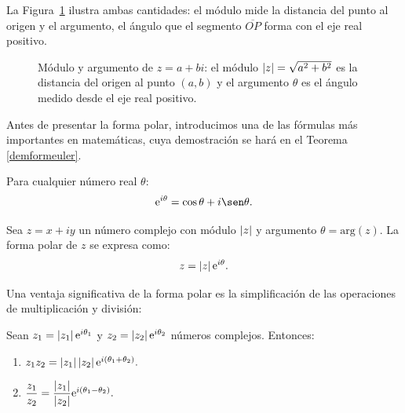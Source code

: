 La Figura~\ref{fig:modulo_argumento} ilustra ambas cantidades: el módulo mide la distancia del punto al origen y el argumento, el ángulo que el segmento $\overline{OP}$ forma con el eje real positivo.

\begin{figure}[!htbp]
\centering
{}
\caption{Módulo y argumento de $z=a+bi$: el módulo $\left\vert z\right\vert=\sqrt{a^2+b^2}$ es la distancia del origen al punto $(a,b)$ y el argumento $\theta$ es el ángulo medido desde el eje real positivo.}
\label{fig:modulo_argumento}
\end{figure}

Antes de presentar la forma polar, introducimos una de las fórmulas más importantes en matemáticas, cuya demostración se hará en el Teorema \ref{demformeuler}.

\begin{theorem}\label{formeuler} Para cualquier número real $\theta$:
$$\mathrm{e}^{i\theta}=\cos \theta + i \sen \theta.$$
\end{theorem}

\begin{definition}
Sea $z=x+iy$ un número complejo con módulo $\left\vert z\right\vert$ y argumento $\theta=\text{arg}(z)$. La forma polar de $z$ se expresa como:
$$z=\left\vert z\right\vert\mathrm{e}^{i\theta}.$$
\end{definition}

Una ventaja significativa de la forma polar es la simplificación de las operaciones de multiplicación y división:

\begin{theorem}
Sean $z_1=\left\vert z_1\right\vert\mathrm{e}^{i\theta_1}$ y $z_2=\left\vert z_2\right\vert\mathrm{e}^{i\theta_2}$ números complejos. Entonces:
\begin{enumerate}[$1.$]
\item $z_1z_2=\left\vert z_1\right\vert\left\vert z_2\right\vert\mathrm{e}^{i(\theta_1 + \theta_2)}.$
\item $\dfrac{z_1}{z_2}=\dfrac{\left\vert z_1\right\vert}{\left\vert z_2\right\vert}\mathrm{e}^{i(\theta_1 - \theta_2)}.$
\end{enumerate}
\end{theorem}

